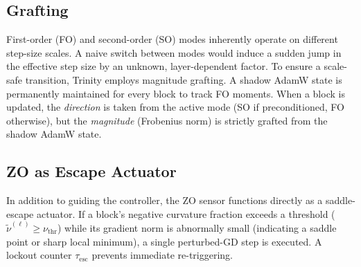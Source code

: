 \documentclass[conference]{IEEEtran}
\begin{document}
\subsection{Grafting}
\label{subsec:grafting}
First-order (FO) and second-order (SO) modes inherently operate on different step-size scales. A naive switch between modes would induce a sudden jump in the effective step size by an unknown, layer-dependent factor. To ensure a scale-safe transition, Trinity employs magnitude grafting. A shadow AdamW state is permanently maintained for every block to track FO moments. When a block is updated, the \textit{direction} is taken from the active mode (SO if preconditioned, FO otherwise), but the \textit{magnitude} (Frobenius norm) is strictly grafted from the shadow AdamW state.

\subsection{ZO as Escape Actuator}
\label{subsec:escape}
In addition to guiding the controller, the ZO sensor functions directly as a saddle-escape actuator. If a block's negative curvature fraction exceeds a threshold ($\tilde{\nu}^{(\ell)} \ge \nu_{\mathrm{thr}}$) while its gradient norm is abnormally small (indicating a saddle point or sharp local minimum), a single perturbed-GD step is executed. A lockout counter $\tau_{\mathrm{esc}}$ prevents immediate re-triggering.
\end{document}
